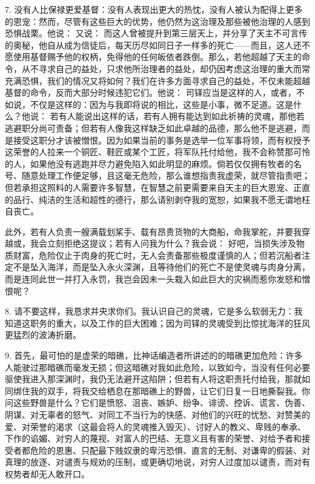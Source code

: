 7. 没有人比保禄更爱基督：没有人表现出更大的热忱，没有人被认为配得上更多的恩宠：然而，尽管有这些巨大的优势，他仍然为这治理及那些被他治理的人感到恐惧战栗。他说：  又说：  而这人曾被提升到第三层天上，并分享了天主不可言传的奥秘，他自从成为信徒后，每天历尽如同日子一样多的死亡——而且，这人还不愿使用基督赐予他的权柄，免得他的任何皈依者跌倒。那么，若他超越了天主的命令，从不寻求自己的益处，只求他所治理者的益处，却仍因考虑这治理的重大而常充满恐惧，我们的情况又将如何？我们在许多方面寻求自己的益处，不仅未能超越基督的命令，反而大部分时候违犯它们。他说：  司铎应当是这样的人，或者，不如说，不仅是这样的：因为与我即将说的相比，这些是小事，微不足道。这是什么？他说：  若有人能说出这样的话，若有人拥有能达到如此祈祷的灵魂，那他若逃避职分尚可责备；但若有人像我这样缺乏如此卓越的品德，那么他不是逃避，而是接受这职分才该被憎恨。因为如果当前的事务是选举一位军事将领，而有权授予这荣誉的人拉来一个铜匠、鞋匠或某个工匠，将军队托付给他，我不会称赞那可怜的人，如果他没有逃跑并尽力避免陷入如此明显的麻烦。倘若仅仅拥有牧者的名号、随意处理工作便足够，且这毫无危险，那么谁想指责我虚荣，就尽管指责吧；但若承担这照料的人需要许多智慧，在智慧之前更需要来自天主的巨大恩宠、正直的品行、纯洁的生活和超性的德行，那么请别剥夺我的宽恕，如果我不愿无谓地枉自丧亡。\par

此外，若有人负责一艘满载划桨手、载有昂贵货物的大商船，命我掌舵，并要我穿越或，我会立刻拒绝这提议；若有人问我为什么？我会说： 好吧，当损失涉及物质财富，危险仅止于肉身的死亡时，无人会责备那些极度谨慎的人；但若沉船者注定不是坠入海洋，而是坠入永火深渊，且等待他们的死亡不是使灵魂与肉身分离，而是连同此世一并打入永罚，我岂会因未一头栽入如此巨大的灾祸而惹你发怒和憎恨呢？\par

8. 请不要这样，我恳求并央求你们。我认识自己的灵魂，它是多么软弱无力：我知道这职务的重大，以及工作的巨大困难；因为司铎的灵魂受到比惊扰海洋的狂风更猛烈的波涛折磨。\par

9. 首先，最可怕的是虚荣的暗礁，比神话编造者所讲述的的暗礁更加危险：许多人能驶过那暗礁而毫发无损；但这暗礁对我如此危险，以致如今，当没有任何必要驱使我进入那深渊时，我仍无法避开这陷阱；但若有人将这职责托付给我，那就如同绑住我的双手，将我交给栖息在那暗礁上的野兽，让它们日复一日地撕裂我。你问这些野兽是什么？它们是愤怒、沮丧、嫉妒、纷争、诽谤、控诉、谎言、伪善、阴谋、对无辜者的怒气、对同工不当行为的快感、对他们的兴旺的忧愁、对赞美的爱、对荣誉的渴求（这最会将人的灵魂推入毁灭）、讨好人的教义、卑贱的奉承、下作的谄媚、对穷人的蔑视、对富人的巴结、无意义且有害的荣誉、对给予者和接受者都危险的恩惠、只配最下贱奴隶的卑污恐惧、直言的无制、对谦卑的假装、对真理的放逐、对谴责与规劝的压制，或更确切地说，对穷人过度加以谴责，而对有权势者却无人敢开口。\par

